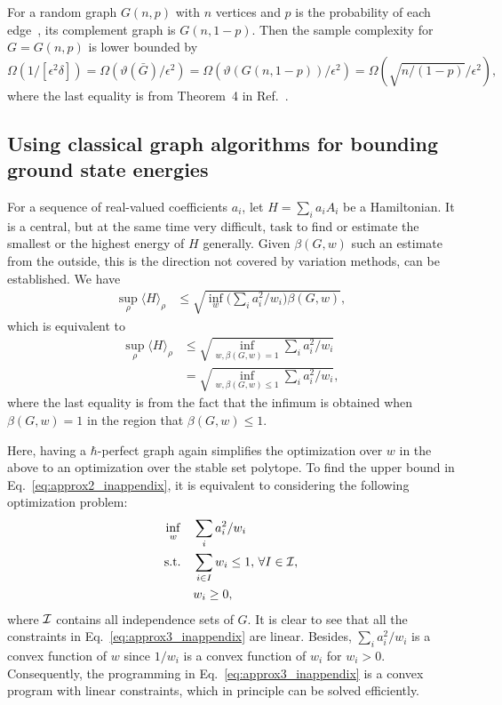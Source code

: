 For a random graph $G(n,p)$ with $n$ vertices and $p$ is the probability of each edge~\cite{coja2005lovasz}, its complement graph is $G(n,1-p)$. Then the sample complexity for $G=G(n,p)$ is lower bounded by 
\begin{equation}
    \Omega(1/[\epsilon^2 \delta]) = \Omega(\vartheta(\bar{G})/\epsilon^2)  = \Omega(\vartheta(G(n,1-p))/\epsilon^2) = \Omega(\sqrt{n/(1-p)}/\epsilon^2),
\end{equation}
where the last equality is from Theorem~4 in Ref.~\cite{coja2005lovasz}.




\subsection{Using classical graph algorithms for bounding ground state energies}\label{ssec:ground}
For a sequence of real-valued coefficients $a_i$, let $H=\sum_i a_i A_i$ be a Hamiltonian. 
It is a central, but at the same time very difficult, task to find or estimate the smallest or the highest energy of $H$ generally. Given $\beta(G,w)$ such an estimate from the outside, this is the direction not covered by variation methods, can be established. 
We have \cite{xu2023bounding}
\begin{align}
    \label{eq:approx2_inappendix}
   \sup_\rho \langle H \rangle_\rho  &\leq \sqrt{\inf_w  \Big( \sum_i a_i^2/w_i\Big)\beta(G,w)},
\end{align}
which is equivalent to 
\begin{align}
    \label{eq:approx2__inappendix2}
   \sup_\rho \langle H \rangle_\rho  &\leq \sqrt{\inf_{w, \beta(G,w)= 1}   \sum_i a_i^2/w_i}\nonumber\\
   &= \sqrt{\inf_{w, \beta(G,w)\le 1}   \sum_i a_i^2/w_i},
\end{align}
where the last equality is from the fact that the infimum is obtained when $\beta(G,w)=1$ in the region that $\beta(G,w)\le 1$.

Here, having a $\hbar$-perfect graph again simplifies the optimization over $w$ in the above to an optimization over the stable set polytope.
To find the upper bound in Eq.~\eqref{eq:approx2_inappendix}, it is equivalent to considering the following optimization problem:
\begin{align}
    \label{eq:approx3_inappendix}
    \inf_w   &\quad\sum_i a_i^2/w_i\nonumber\\
    \mathrm{s.t.} &\quad \sum_{i\in I} w_i \le 1,\, \forall I \in {\cal I},\nonumber\\
    & \quad w_i \ge 0,
\end{align}
where ${\cal I}$ contains all independence sets of $G$.
It is clear to see that all the constraints in Eq.~\eqref{eq:approx3_inappendix} are linear. Besides, $\sum_i a_i^2/w_i$ is a convex function of $w$ since $1/w_i$ is a convex function of $w_i$ for $w_i>0$. Consequently, the programming in Eq.~\eqref{eq:approx3_inappendix} is a convex program with linear constraints, which in principle can be solved efficiently.



